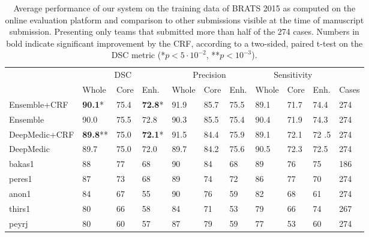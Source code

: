 \documentclass[preprint,authoryear,12pt]{elsarticle}
\begin{document}
\begin{table}[!h]
\centering
\scriptsize
\caption{Average performance of our system on the training data of BRATS 2015 as computed on the online evaluation platform and comparison to other submissions visible at the time of manuscript submission. Presenting only teams that submitted more than half of the 274 cases. Numbers in bold indicate significant improvement by the CRF, according to a two-sided, paired t-test on the DSC metric (*$p<5\cdot 10^{-2}$, **$p<10^{-3}$). }
\label{table:onlineEvalBrats2015Training}
\begin{tabular}{@{}lllllllllll@{}}
\toprule
              & \multicolumn{3}{c}{DSC}  & \multicolumn{3}{c}{Precision} & \multicolumn{3}{c}{Sensitivity} &       \\ \cmidrule(lr){2-10}
              	& Whole & Core 	& Enh. 		& Whole   & Core  	& Enh.  & Whole & Core & Enh.   	& Cases \\ \midrule
              
Ensemble+CRF		& \textbf{90.1}*	&75.4	& \textbf{72.8}*	& 91.9	& 85.7	& 75.5	& 89.1	& 71.7	& 74.4	&274 \\
Ensemble			& 90.0			&75.5	& 72.8			& 90.3	& 85.5	& 75.4	& 90.4	& 71.9	& 74.3	&274 \\
DeepMedic+CRF	& \textbf{89.8}**&75.0	& \textbf{72.1}*	& 91.5	& 84.4	& 75.9	& 89.1	& 72.1	& 72	.5	&274 \\
DeepMedic		& 89.7			& 75.0	& 72.0			& 89.7	& 84.2	& 75.6	& 90.5	& 72.3	& 72.5	&274 \\

bakas1		 	& 88				& 77		& 68				& 90		& 84		& 68		& 89		& 76		& 75		&186\\
peres1		 	& 87				& 73		& 68				& 89		& 74		& 72		& 86		& 77		& 70		&274\\
anon1		 	& 84				& 67		& 55				& 90		& 76		& 59		& 82		& 68		& 61		&274\\
thirs1		 	& 80				& 66		& 58				& 84		& 71		& 53 	& 79		& 66		& 74		&267\\
peyrj			& 80				& 60		& 57				& 87		& 79		& 59		& 77		& 53		& 60		&274\\
\bottomrule
\end{tabular}
\end{table}
\end{document}
